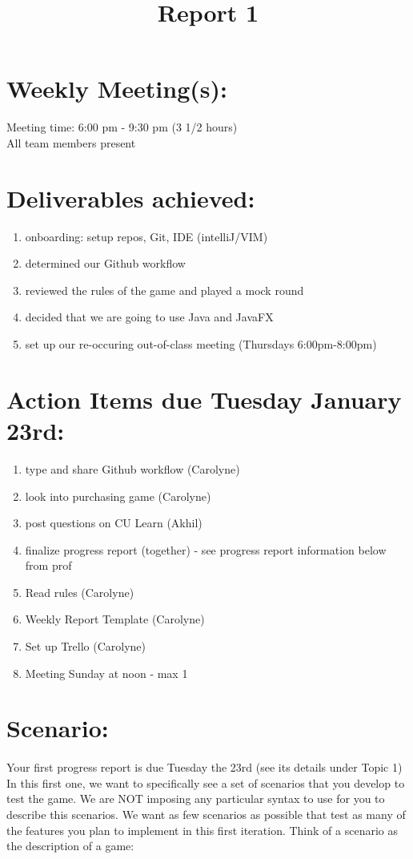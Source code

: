 \documentclass[a4paper,11pt]{article}
\title{Report 1}
\begin{document}
\section{Weekly Meeting(s):}
Meeting time: 6:00 pm - 9:30 pm (3 1/2 hours)\\
All team members present

\section{Deliverables achieved:}
\begin{enumerate}
\item	onboarding: setup repos, Git, IDE (intelliJ/VIM)
\item determined our Github workflow
\item reviewed the rules of the game and played a mock round
\item decided that we are going to use Java and JavaFX
\item set up our re-occuring out-of-class meeting (Thursdays 6:00pm-8:00pm)
\end{enumerate}

\section{Action Items due Tuesday January 23rd:}
\begin{enumerate}
\item type and share Github workflow (Carolyne)
\item look into purchasing game (Carolyne)
\item post questions on CU Learn (Akhil)
\item finalize progress report (together) - see progress report information below from prof
\item Read rules (Carolyne)
\item Weekly Report Template (Carolyne)
\item Set up Trello (Carolyne)
\item Meeting Sunday at noon - max 1

\end{enumerate}

\section{Scenario:}
\paragraph{}
Your first progress report is due Tuesday the 23rd (see its details under Topic 1)
In this first one, we want to specifically see a set of scenarios that you develop to test the game.
We are NOT imposing any particular syntax to use for you to describe this scenarios.
We want as few scenarios as possible that test as many of the features you plan to implement in this first iteration.
Think of a scenario as the description of a game:
\end{document}
